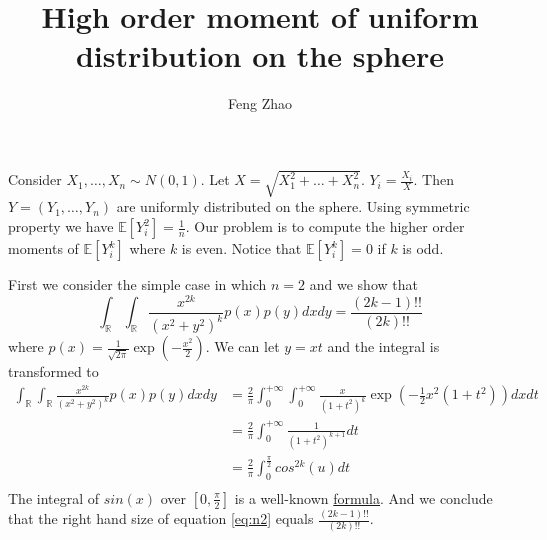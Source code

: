 \documentclass{article}
\title{High order moment of uniform distribution on the sphere}
\author{Feng Zhao}
\def\E{\mathbb{E}}
\def\R{\mathbb{R}}
\begin{document}
\maketitle
Consider $X_1, \dots, X_n \sim N(0, 1)$.
Let $X = \sqrt{X_1^2 + \dots + X_n^2}$.
$Y_i = \frac{X_i}{X}$.
Then $Y=(Y_1, \dots, Y_n)$ are uniformly distributed on the sphere.
Using symmetric property we have $\E[Y_i^2] = \frac{1}{n}$.
Our problem is to compute the higher order moments of $\E[Y_i^k]$
where $k$ is even. Notice that $\E[Y_i^k]=0$ if $k$ is odd.

First we consider the simple case in which $n=2$ and we show that
\begin{equation}\label{eq:n2}
\int_{\R}\int_{\R} \frac{x^{2k}}{(x^2+y^2)^k}
    p(x)p(y)dxdy = \frac{(2k-1)!!}{(2k)!!}
\end{equation}
where $p(x) = \frac{1}{\sqrt{2\pi}} \exp(-\frac{x^2}{2})$.
We can let $y=xt$ and the integral is transformed to
\begin{align*}
\int_{\R}\int_{\R} \frac{x^{2k}}{(x^2+y^2)^k} p(x)p(y)dxdy & =
\frac{2}{\pi}\int_{0}^{+\infty}\int_{0}^{+\infty} \frac{x}{(1+t^2)^k}
\exp(-\frac{1}{2}x^2(1+t^2))dxdt \\
&=
\frac{2}{\pi}\int_{0}^{+\infty} \frac{1}{(1+t^2)^{k+1}}dt \\
&= \frac{2}{\pi}\int_{0}^{\frac{\pi}{2}} cos^{2k}(u)dt \\
\end{align*}
The integral of $sin(x)$ over $[0, \frac{\pi}{2}]$ is a well-known
\href{https://math.stackexchange.com/questions/50447/
integration-of-powers-of-the-sin-x}{formula}.
And we conclude that the right hand size of equation \eqref{eq:n2} equals
$\frac{(2k-1)!!}{(2k)!!}$.
\end{document}
